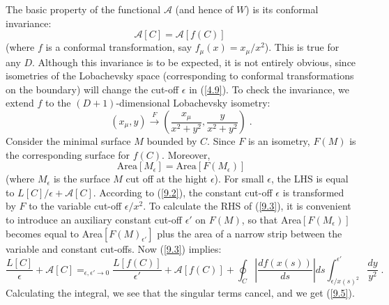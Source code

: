 \documentclass[a4paper,12pt]{article}
\numberwithin{equation}{section}
\begin{document}
The basic property of the functional \( \mathcal{A} \) (and hence of \( W \))
is its conformal invariance: 
\begin{equation}
\label{9.5}
\mathcal{A}[C]=\mathcal{A}[f(C)]\; 
\end{equation}
 (where \( f \) is a conformal transformation, say \( f_{\mu }(x)=x_{\mu }/x^{2} \)).
This is true for any \( D \). Although this invariance is to be expected, it
is not entirely obvious, since isometries of the Lobachevsky space (corresponding
to conformal transformations on the boundary) will change the cut-off \( \epsilon  \)
in (\ref{4.9}). To check the invariance, we extend \( f \) to the \( (D+1) \)-dimensional
Lobachevsky isometry:
\begin{equation}
\label{9.2}
(x_{\mu },y)\stackrel{{F}}{\rightarrow }\left( \frac{x_{\mu }}{x^{2}+y^{2}},\frac{y}{x^{2}+y^{2}}\right) \; .
\end{equation}
Consider the minimal surface \( M \) bounded by \( C \). Since \( F \) is
an isometry, \( F(M) \) is the corresponding surface for \( f(C) \). Moreover,
\begin{equation}
\label{9.3}
\textrm{Area}[M_{\epsilon }]=\textrm{Area}[F(M_{\epsilon })]
\end{equation}
(where \( M_{\epsilon } \) is the surface \( M \) cut off at the hight \( \epsilon  \)).
For small \( \epsilon  \), the LHS is equal to \( L[C]/\epsilon +\mathcal{A}[C] \).
According to (\ref{9.2}), the constant cut-off \( \epsilon  \) is transformed
by \( F \) to the variable cut-off \( \epsilon /x^{2} \). To calculate the
RHS of (\ref{9.3}), it is convenient to introduce an auxiliary constant cut-off
\( \epsilon ' \) on \( F(M) \), so that Area\( [F(M_{\epsilon })] \) becomes
equal to Area\( [F(M)_{\epsilon '}] \) plus the area of a narrow strip between
the variable and constant cut-offs. Now (\ref{9.3}) implies:
\[
\frac{L[C]}{\epsilon }+\mathcal{A}[C]\mathop {=}_{\epsilon ,\epsilon '\to 0}\frac{L[f(C)]}{\epsilon '}+\mathcal{A}[f(C)]+\oint _{C}\left| \frac{df(x(s))}{ds}\right| ds\int _{\epsilon /x(s)^{2}}^{\epsilon '}\frac{dy}{y^{2}}\; .\]
 Calculating the integral, we see that the singular terms cancel, and we get
(\ref{9.5}). 
\end{document}
